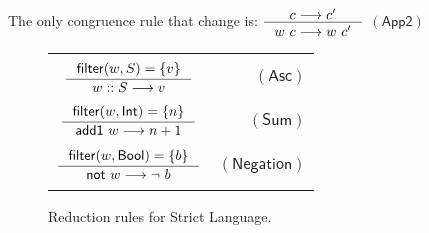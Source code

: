 \documentclass[preprint,authoryear,sort&compress,9pt,nocopyrightspace]{article}
\newcommand\rulename[1]{\mathsf{(#1)}}
\newcommand{\tto}{\longrightarrow}
\newcommand{\conf}[2][s]{(#2)[#1]}
\newcommand{\confextW}[1]{#1 [x \mapsto w \oplus s]}
\newcommand{\ascripS}[1]{#1::S}
\newcommand{\oletP}[3]{\mathsf{mlet} \ x = #2 \ \mathsf{in}  \ #3}
\newcommand{\absST}[2]{\lambda #1. \ #2}
\newcommand{\negacion}[1]{\mathsf{not} \ #1}
\newcommand{\suma}[1]{\mathsf{add1} \ #1}
\newcommand{\boolt}{\mathsf{Bool}}
\newcommand{\intt}{\mathsf{Int}}
\newcommand{\funt}{\mathsf{Fun}}
\newcommand{\filtrar}{\mathsf{filter}}
\newcommand{\buscar}{\mathsf{lookup}}
\newcommand{\semanticC}{Strict Language}
\begin{document}
The only congruence rule that change is:
$ \inference {c \tto c'}{w \ c \tto w \ c'}$ $\rulename{App2}  $\\

\begin{figure}[]
\begin{small}
\begin{center}
\begin{tabular}{|c r|}
\hline
&\\
$ \inference {\filtrar(w, S) = \{v\}} {\ascripS{w} \tto v } $&$\rulename{Asc} $\\
&\\
$\inference {\filtrar(w, \intt)  = \{n\} }{\suma{w} \tto n + 1}$&$\rulename{Sum}$\\
&\\
$\inference {\filtrar(w, \boolt)  = \{b\} }{\negacion{w}\tto {\neg \ b}}$&$\rulename{Negation}$\\

&\\
\hline
\end{tabular}
\caption{Reduction rules for \semanticC.}
\label{tabla:reductionRulesStrictMore}
\end{center}
\end{small}
\end{figure}
\end{document}

